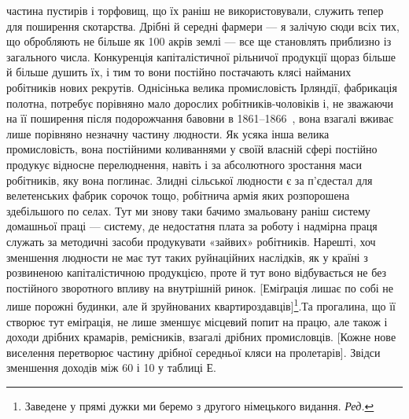 \parcont{}  %
частина пустирів і торфовищ, що їх раніш не використовували,
служить тепер для поширення скотарства. Дрібні й середні
фармери — я залічую сюди всіх тих, що обробляють не більше
як 100 акрів землі — все ще становлять приблизно  із загального
числа.  Конкуренція капіталістичної рільничої продукції
щораз більше й більше душить їх, і тим то вони постійно постачають
клясі найманих робітників нових рекрутів. Однісінька
велика промисловість Ірляндії, фабрикація полотна, потребує
порівняно мало дорослих робітників-чоловіків і, не зважаючи
на її поширення після подорожчання бавовни в 1861--1866~,
вона взагалі вживає лише порівняно незначну частину людности.
Як усяка інша велика промисловість, вона постійними коливаннями
у своїй власній сфері постійно продукує відносне перелюднення,
навіть і за абсолютного зростання маси робітників, яку
вона поглинає. Злидні сільської людности є за п’єдестал для велетенських
фабрик сорочок тощо, робітнича армія яких розпорошена
здебільшого по селах. Тут ми знову таки бачимо змальовану
раніш систему домашньої праці — систему, де недостатня
плата за роботу і надмірна праця служать за методичні засоби
продукувати «зайвих» робітників. Нарешті, хоч зменшення людности
не має тут таких руйнаційних наслідків, як у країні з розвиненою
капіталістичною продукцією, проте й тут воно відбувається
не без постійного зворотного впливу на внутрішній ринок.
[Еміґрація лишає по собі не лише порожні будинки, але й зруйнованих
квартироздавців]\footnote*{Заведене у прямі дужки ми беремо з другого німецького видання. \emph{Ред.}}.Та прогалина, що її створює тут
еміґрація, не лише зменшує місцевий попит на працю, але також
і доходи дрібних крамарів, ремісників, взагалі дрібних промисловців.
[Кожне нове виселення перетворює частину дрібної середньої
кляси на пролетарів]\footnotemarkZ[\value{footnoteZ}]. Звідси зменшення доходів між
60 і 10 у таблиці Е.

